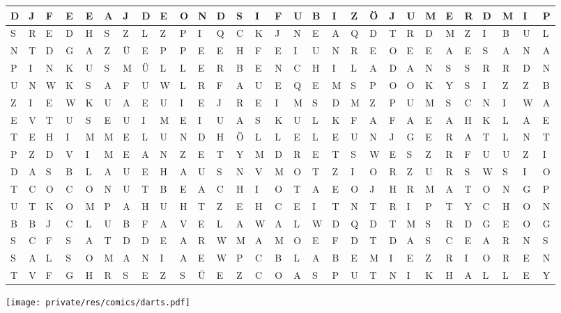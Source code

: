 \begin{center}
\begin{tabular}{| *{29}{>{\centering\arraybackslash}m{1.1em} |}}
		\\ \hline
		D & J & F & E & E & A & J & D & E & O & N & D & S & I & F & U & B & I
			& Z & Ö & J & U & M & E & R & D & M & I & P
		\\ \hline
		S & R & E & D & H & S & Z & L & Z & P & I & Q & C & K & J & N & E & A
			& Q & D & T & R & D & M & Z & I & B & U & L
		\\ \hline
		N & T & D & G & A & Z & Ü & E & P & P & E & E & H & F & E & I & U & N
			& R & E & O & E & E & A & E & S & A & N & A
		\\ \hline
		P & I & N & K & U & S & M & Ü & L & L & E & R & B & E & N & C & H & I
			& L & A & D & A & N & S & S & R & R & D & N
		\\ \hline
		U & N & W & K & S & A & F & U & W & L & R & F & A & U & E & Q & E & M
			& S & P & O & O & K & Y & S & I & Z & Z & B
		\\ \hline
		Z & I & E & W & K & U & A & E & U & I & E & J & R & E & I & M & S & D
			& M & Z & P & U & M & S & C & N & I & W & A
		\\ \hline
		E & V & T & U & S & E & U & I & M & E & I & U & A & S & K & U & L & K
			& F & A & F & A & E & A & H & K & L & A & E
		\\ \hline
		T & E & H & I & M & M & E & L & U & N & D & H & Ö & L & L & E & L & E
			& U & N & J & G & E & R & A & T & L & N & T
		\\ \hline
		P & Z & D & V & I & M & E & A & N & Z & E & T & Y & M & D & R & E & T
			& S & W & E & S & Z & R & F & U & U & Z & I
		\\ \hline
		D & A & S & B & L & A & U & E & H & A & U & S & N & V & M & O & T & Z
			& I & O & R & Z & U & R & S & W & S & I & O
		\\ \hline
		T & C & O & C & O & N & U & T & B & E & A & C & H & I & O & T & A & E
			& O & J & H & R & M & A & T & O & N & G & P
		\\ \hline
		U & T & K & O & M & P & A & H & U & H & T & Z & E & H & C & E & I & T
			& N & T & R & I & P & T & Y & C & H & O & N
		\\ \hline
		B & B & J & C & L & U & B & F & A & V & E & L & A & W & A & L & W & D
			& Q & D & T & M & S & R & D & G & E & O & G
		\\ \hline
		S & C & F & S & A & T & D & D & E & A & R & W & M & A & M & O & E & F
			& D & T & D & A & S & C & E & A & R & N & S
		\\ \hline
		S & A & L & S & O & M & A & N & I & A & E & W & P & C & B & L & A & B
			& E & M & I & E & Z & R & I & O & R & E & N
		\\ \hline
		T & V & F & G & H & R & S & E & Z & S & Ü & E & Z & C & O & A & S & P
			& U & T & N & I & K & H & A & L & L & E & Y
		\\ \hline
	\end{tabular}
	
	\texttt{[image: private/res/comics/darts.pdf]}
\end{center}

